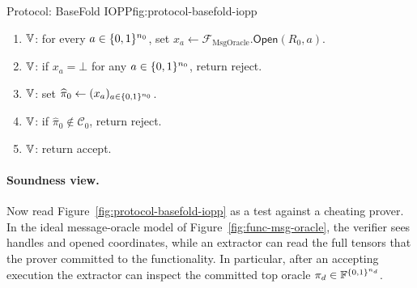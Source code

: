 \begin{protocolbox}{Protocol: BaseFold IOPP}{fig:protocol-basefold-iopp}
\begin{enumerate}[leftmargin=0.24in,label=\textbf{P\arabic*.},itemsep=0.08em,topsep=0.1em,parsep=0pt]
\begin{enumerate}[leftmargin=0.28in,label=\textbf{P\arabic*.\alph*.},itemsep=0.05em,topsep=0.05em,parsep=0pt]
\begin{enumerate}[leftmargin=0.32in,label=\textbf{P\arabic*.\alph*.\roman*.},itemsep=0.04em,topsep=0.04em,parsep=0pt]
                        \(x_0\gets\mathcal F_{\mathrm{MsgOracle}}.\mathsf{Open}(R_{i+1},(a_{q,i},0))\).
                  \item \(\prover,\verifier\):
                        \(x_1\gets\mathcal F_{\mathrm{MsgOracle}}.\mathsf{Open}(R_{i+1},(a_{q,i},1))\).
                  \item \(\prover,\verifier\):
                        \(x_\star\gets\mathcal F_{\mathrm{MsgOracle}}.\mathsf{Open}(R_i,a_{q,i})\).
                  \item \(\verifier\): if \(x_0=\bot\) or \(x_1=\bot\) or
                        \(x_\star=\bot\), return reject.
                  \item \(\verifier\): let \(L(X)\in\F[X]\) be the line with
                        \(L(t_{i,a_{q,i}})=x_0\) and
                        \(L(t_{i,a_{q,i}}+1)=x_1\).
                  \item \(\verifier\): if \(L(\alpha_i)\ne x_\star\), return reject.
                \end{enumerate}
        \end{enumerate}
  \item \(\verifier\): for every \(a\in\{0,1\}^{n_0}\), set
        \(x_a\gets\mathcal F_{\mathrm{MsgOracle}}.\mathsf{Open}(R_0,a)\).
  \item \(\verifier\): if \(x_a=\bot\) for any \(a\in\{0,1\}^{n_0}\), return reject.
  \item \(\verifier\): set \(\widehat\pi_0\gets(x_a)_{a\in\{0,1\}^{n_0}}\).
  \item \(\verifier\): if \(\widehat\pi_0\notin\mathcal{C}_0\), return reject.
  \item \(\verifier\): return accept.
\end{enumerate}
\end{protocolbox}

\paragraph{Soundness view.}
Now read Figure~\ref{fig:protocol-basefold-iopp} as a test against a cheating
prover.  In the ideal message-oracle model of Figure~\ref{fig:func-msg-oracle},
the verifier sees handles and opened coordinates, while an extractor can read
the full tensors that the prover committed to the functionality.  In
particular, after an accepting execution the extractor can inspect the committed
top oracle
$\pi_d\in\mathbb{F}^{\{0,1\}^{n_d}}$.

